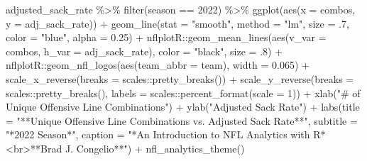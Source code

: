 \documentclass[
  letterpaper,
]{krantz}
\newenvironment{Shaded}{\begin{snugshade}}{\end{snugshade}}
\newcommand{\AttributeTok}[1]{\textcolor[rgb]{0.40,0.45,0.13}{#1}}
\newcommand{\DecValTok}[1]{\textcolor[rgb]{0.68,0.00,0.00}{#1}}
\newcommand{\FloatTok}[1]{\textcolor[rgb]{0.68,0.00,0.00}{#1}}
\newcommand{\FunctionTok}[1]{\textcolor[rgb]{0.28,0.35,0.67}{#1}}
\newcommand{\NormalTok}[1]{\textcolor[rgb]{0.00,0.23,0.31}{#1}}
\newcommand{\SpecialCharTok}[1]{\textcolor[rgb]{0.37,0.37,0.37}{#1}}
\newcommand{\StringTok}[1]{\textcolor[rgb]{0.13,0.47,0.30}{#1}}
\begin{document}
\begin{Shaded}
\begin{Highlighting}[]
\NormalTok{adjusted\_sack\_rate }\SpecialCharTok{\%\textgreater{}\%}
  \FunctionTok{filter}\NormalTok{(season }\SpecialCharTok{==} \DecValTok{2022}\NormalTok{) }\SpecialCharTok{\%\textgreater{}\%}
  \FunctionTok{ggplot}\NormalTok{(}\FunctionTok{aes}\NormalTok{(}\AttributeTok{x =}\NormalTok{ combos, }\AttributeTok{y =}\NormalTok{ adj\_sack\_rate)) }\SpecialCharTok{+}
  \FunctionTok{geom\_line}\NormalTok{(}\AttributeTok{stat =} \StringTok{"smooth"}\NormalTok{, }\AttributeTok{method =} \StringTok{"lm"}\NormalTok{,}
            \AttributeTok{size =}\NormalTok{ .}\DecValTok{7}\NormalTok{,}
            \AttributeTok{color =} \StringTok{"blue"}\NormalTok{,}
            \AttributeTok{alpha =} \FloatTok{0.25}\NormalTok{) }\SpecialCharTok{+}
\NormalTok{  nflplotR}\SpecialCharTok{::}\FunctionTok{geom\_mean\_lines}\NormalTok{(}\FunctionTok{aes}\NormalTok{(}\AttributeTok{v\_var =}\NormalTok{ combos, }\AttributeTok{h\_var =}\NormalTok{ adj\_sack\_rate),}
                            \AttributeTok{color =} \StringTok{"black"}\NormalTok{, }\AttributeTok{size =}\NormalTok{ .}\DecValTok{8}\NormalTok{) }\SpecialCharTok{+}
\NormalTok{  nflplotR}\SpecialCharTok{::}\FunctionTok{geom\_nfl\_logos}\NormalTok{(}\FunctionTok{aes}\NormalTok{(}\AttributeTok{team\_abbr =}\NormalTok{ team), }\AttributeTok{width =} \FloatTok{0.065}\NormalTok{) }\SpecialCharTok{+}
  \FunctionTok{scale\_x\_reverse}\NormalTok{(}\AttributeTok{breaks =}\NormalTok{ scales}\SpecialCharTok{::}\FunctionTok{pretty\_breaks}\NormalTok{()) }\SpecialCharTok{+}
  \FunctionTok{scale\_y\_reverse}\NormalTok{(}\AttributeTok{breaks =}\NormalTok{ scales}\SpecialCharTok{::}\FunctionTok{pretty\_breaks}\NormalTok{(),}
                     \AttributeTok{labels =}\NormalTok{ scales}\SpecialCharTok{::}\FunctionTok{percent\_format}\NormalTok{(}\AttributeTok{scale =} \DecValTok{1}\NormalTok{)) }\SpecialCharTok{+}
  \FunctionTok{xlab}\NormalTok{(}\StringTok{"\# of Unique Offensive Line Combinations"}\NormalTok{) }\SpecialCharTok{+}
  \FunctionTok{ylab}\NormalTok{(}\StringTok{"Adjusted Sack Rate"}\NormalTok{) }\SpecialCharTok{+}
  \FunctionTok{labs}\NormalTok{(}\AttributeTok{title =} \StringTok{"**Unique Offensive Line Combinations vs. Adjusted Sack Rate**"}\NormalTok{,}
       \AttributeTok{subtitle =} \StringTok{"*2022 Season*"}\NormalTok{,}
       \AttributeTok{caption =} \StringTok{"*An Introduction to NFL Analytics with R*\textless{}br\textgreater{}**Brad J. Congelio**"}\NormalTok{) }\SpecialCharTok{+}
  \FunctionTok{nfl\_analytics\_theme}\NormalTok{()}
\end{Highlighting}
\end{Shaded}
\end{document}
